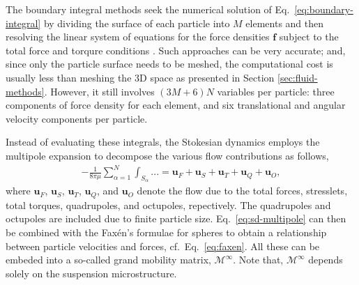 The boundary integral methods seek the numerical solution of Eq.\ \eqref{eq:boundary-integral} by dividing the surface of each particle into $M$ elements and then resolving the linear system of equations for the force densities $\bm f$ subject to the total force and torqure conditions \citep{Pozrikidis}.
Such approaches can be very accurate; and, since only the particle surface needs to be meshed, the computational cost is usually less than meshing the 3D space as presented in Section \ref{sec:fluid-methods}.
However, it still involves $(3M+6)N$ variables per particle: three components of force density for each element, and six translational and angular velocity components per particle.

Instead of evaluating these integrals, the Stokesian dynamics \citep{durlofsky_brady_bossis_1987} employs the multipole expansion to decompose the various flow contributions as follows,
\begin{equation} \label{eq:sd-multipole}
 \begin{aligned}
  - \frac{1}{8\pi \mu} \sum_{\alpha=1}^N  \int_{S_\alpha} ... =
  \bm{u}_F + \bm{u}_S + \bm{u}_T + \bm{u}_Q + \bm{u}_O, 
 \end{aligned}
\end{equation}
where $\bm{u}_F$, $\bm{u}_S$, $\bm{u}_T$, $\bm{u}_Q$, and $\bm{u}_O$ denote the flow due to the total forces, stresslets, total torques, quadrupoles, and octupoles, repectively. The quadrupoles and octupoles are included due to finite particle size.
Eq.\ \eqref{eq:sd-multipole} can then be combined with the Fax\'{e}n's formulae for spheres to obtain a relationship between particle velocities and forces, cf.\ Eq.\ \eqref{eq:faxen}.
All these can be embeded into a so-called grand mobility matrix, $\mathscr{M}^\infty$. Note that, $\mathscr{M}^\infty$ depends solely on the suspension microstructure.

